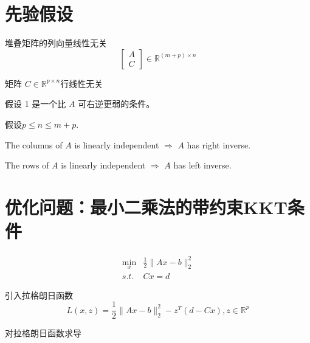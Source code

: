 \section{先验假设}

\begin{proposition}
    \label{prop:assumption-1}

    堆叠矩阵的列向量线性无关
\begin{equation}
\left[\begin{array}{l}
A \\
C
\end{array}\right] \in \mathbb{R}^{(m+p) \times n}
\end{equation}
\end{proposition}

\begin{proposition}
    \label{prop:assumption-2}
    矩阵 $ C \in \mathbb{R}^{p \times n} $行线性无关

\end{proposition}

假设 1 是一个比 $ A $ 可右逆更弱的条件。 

假设$ p \leq n \leq m+p $.

\begin{remark}
    The columns of $A$ is linearly independent $\Rightarrow$ $A$ has right inverse.

    The rows of $A$ is linearly independent $\Rightarrow$ $A$ has left inverse.
\end{remark}

\section{优化问题：最小二乘法的带约束KKT条件}

\begin{problem}
    \begin{equation}\begin{aligned}
        \min _{x} & \frac{1}{2}\|A x-b\|_{2}^{2}\\
        s.t. & C x=d
    \end{aligned}\end{equation}
\end{problem}


引入拉格朗日函数
\begin{equation}
L(x, z)=\frac{1}{2}\|A x-b\|_{2}^{2}-z^{T}(d-C x), z \in \mathbb{R}^{p}
\end{equation}

对拉格朗日函数求导


